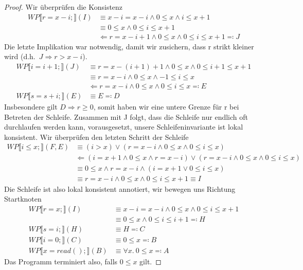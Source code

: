 \documentclass[hidelinks]{article}
\theoremstyle{plain}
\theoremstyle{definition}
\theoremstyle{rem}
\begin{document}
\begin{sloppypar}
\begin{proof}
Wir überprüfen die Konsistenz
\begin{align*}
WP\llbracket r=x-i;\rrbracket(I)&\equiv x-i=x-i\wedge 0\le x \wedge i\le x+1\\
&\equiv 0\le x \wedge 0\le i \le x+1\\
&\Leftarrow r=x-i+1 \wedge 0\le x \wedge 0\le i \le x+1\eqqcolon J
\end{align*}
Die letzte Implikation war notwendig, damit wir zusichern, dass r strikt kleiner wird (d.h.\ $J\Rightarrow r>x-i$).
\begin{align*}
WP\llbracket i=i+1;\rrbracket(J)&\equiv r=x-(i+1)+1 \wedge 0\le x \wedge 0\le i+1 \le x+1\\
&\equiv r=x-i \wedge 0\le x \wedge -1\le i \le x\\
&\Leftarrow r= x-i \wedge 0\le x \wedge 0\le i \le x\eqqcolon E\\
WP\llbracket s=s+i;\rrbracket(E)&\equiv E\eqqcolon D
\end{align*}
Insbesondere gilt $D\Rightarrow r\ge 0$, somit haben wir eine untere Grenze für r bei Betreten der Schleife. Zusammen mit J folgt, dass die Schleife nur endlich oft durchlaufen werden kann, vorausgesetzt, unsere Schleifeninvariante ist lokal konsistent. Wir überprüfen den letzten Schritt der Schleife
\begin{align*}
WP\llbracket i\le x;\rrbracket(F,E)&\equiv (i>x)\vee(r= x-i \wedge 0\le x \wedge 0\le i \le x)\\
&\Leftarrow (i=x+1 \wedge 0\le x \wedge r=x-i)\vee(r=x-i \wedge 0\le x \wedge 0\le i \le x)\\
&\equiv 0\le x \wedge r=x-i \wedge (i=x+1 \vee 0\le i \le x)\\
&\equiv r=x-i \wedge 0\le x \wedge 0\le i \le x+1\equiv I
\end{align*}
Die Schleife ist also lokal konsistent annotiert, wir bewegen uns Richtung Startknoten
\begin{align*}
WP\llbracket r=x;\rrbracket(I)&\equiv x-i=x-i \wedge 0\le x \wedge 0\le i \le x+1\\
&\equiv 0\le x \wedge 0 \le i\le i+1\eqqcolon H\\
WP\llbracket s=i;\rrbracket(H)&\equiv H\eqqcolon C\\
WP\llbracket i=0;\rrbracket(C)&\equiv 0\le x\eqqcolon B\\
WP\llbracket x=read();\rrbracket(B)&\equiv \forall x.\ 0\le x\eqqcolon A
\end{align*}
Das Programm terminiert also, falls $0\le x$ gilt.
\end{proof}

\end{sloppypar}
\end{document}
